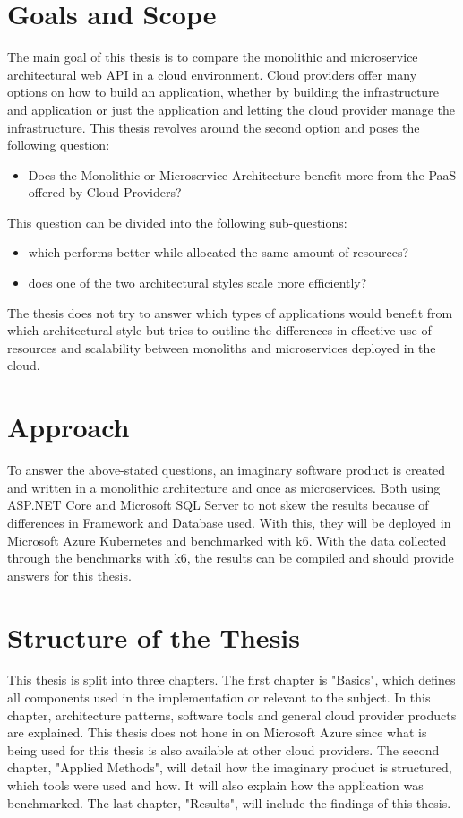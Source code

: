 \documentclass[BIF,Bachelor,nenglish]{twbook}%
\begin{document}
\section{Goals and Scope}
The main goal of this thesis is to compare the monolithic and microservice architectural web \ac{API} in a cloud environment. Cloud providers offer many options on how to build an application, whether by building the infrastructure and application or just the application and letting the cloud provider manage the infrastructure. This thesis revolves around the second option and poses the following question:

\begin{itemize}
\item Does the Monolithic or Microservice Architecture benefit more from the \ac{PaaS} offered by Cloud Providers?
\end{itemize}

\noindent
This question can be divided into the following sub-questions:

\begin{itemize}
\item which performs better while allocated the same amount of resources?
\item does one of the two architectural styles scale more efficiently?
\end{itemize}

The thesis does not try to answer which types of applications would benefit from which architectural style but tries to outline the differences in effective use of resources and scalability between monoliths and microservices deployed in the cloud.

\section{Approach}
To answer the above-stated questions, an imaginary software product is created and written in a monolithic architecture and once as microservices. Both using ASP.NET Core and Microsoft SQL Server to not skew the results because of differences in Framework and Database used. With this, they will be deployed in Microsoft Azure Kubernetes and benchmarked with k6. With the data collected through the benchmarks with k6, the results can be compiled and should provide answers for this thesis.

\section{Structure of the Thesis}
This thesis is split into three chapters. The first chapter is "Basics", which defines all components used in the implementation or relevant to the subject. In this chapter, architecture patterns, software tools and general cloud provider products are explained. This thesis does not hone in on Microsoft Azure since what is being used for this thesis is also available at other cloud providers. The second chapter, "Applied Methods", will detail how the imaginary product is structured, which tools were used and how. It will also explain how the application was benchmarked. The last chapter, "Results", will include the findings of this thesis.
\end{document}
